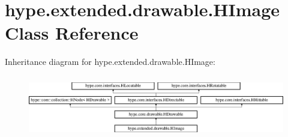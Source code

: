 \hypertarget{classhype_1_1extended_1_1drawable_1_1_h_image}{\section{hype.\-extended.\-drawable.\-H\-Image Class Reference}
\label{classhype_1_1extended_1_1drawable_1_1_h_image}
}
Inheritance diagram for hype.\-extended.\-drawable.\-H\-Image\-:\begin{figure}[H]
\begin{center}
\leavevmode
\includegraphics[height=2.745098cm]{classhype_1_1extended_1_1drawable_1_1_h_image}
\end{center}
\end{figure}
